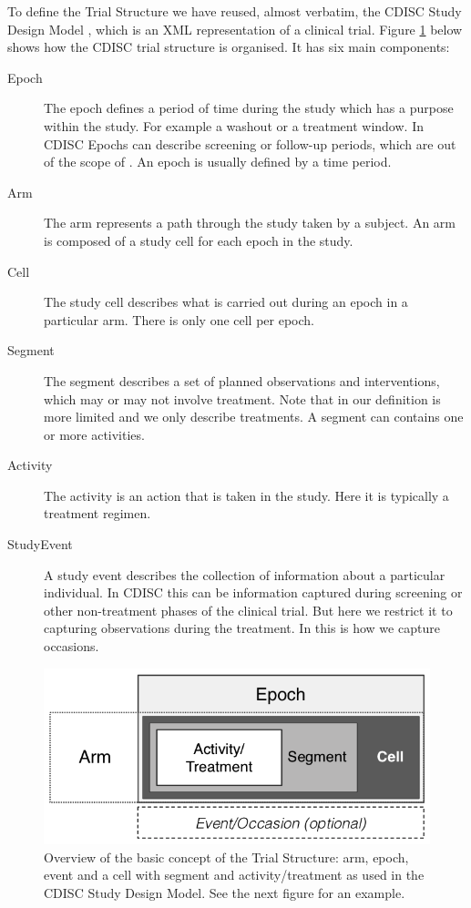   To define the Trial Structure we have reused, almost verbatim, the
 CDISC Study Design Model \cite{CDISC:2011a}, which is an
 XML representation of a clinical trial. Figure \ref{fig:CellSegmentEpochArmEvent_concept}
 below shows how the CDISC trial structure is organised. It has six main components:
 \begin{description}
 \item[Epoch] The epoch defines a period of time during the study which
   has a purpose within the study. For example a washout or a treatment
   window. In CDISC Epochs can describe screening or follow-up periods,
   which are out of the scope of \pharmml. An epoch is usually defined
   by a time period.
 \item[Arm] The arm represents a path through the study taken by a
   subject. An arm is composed of a study cell for each epoch in the study.
 \item[Cell] The study cell describes what is carried out during an
   epoch in a particular arm. There is only one cell per epoch.
 \item[Segment] The segment describes a set of planned observations and
   interventions, which may or may not involve treatment. Note that in
   \pharmml our definition is more limited and we only describe
   treatments. A segment can contains one or more activities.
 \item[Activity] The activity is an action that is taken in the
   study. Here it is typically a treatment regimen.
 \item[StudyEvent] A study event describes the collection of
   information about a particular individual. In CDISC this can be
   information captured during screening or other non-treatment phases
   of the clinical trial. But here we restrict it to capturing
   observations during the treatment. In \pharmml this is how we
   capture occasions.
 \end{description}
  \begin{figure}[htb]
 \centering
 \includegraphics[height=0.2\textheight]{pics/CellSegmentEpochArmEvent_concept}%
 \caption{Overview of the basic concept of the Trial Structure: arm, 
 epoch, event and a cell with segment and activity/treatment as used in the CDISC Study
   Design Model. See the next figure for an example.}
 \label{fig:CellSegmentEpochArmEvent_concept}
 \end{figure}

